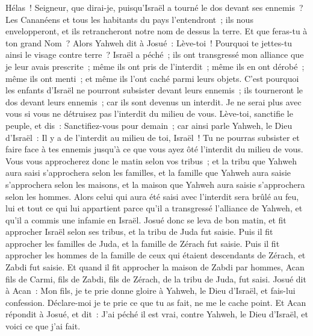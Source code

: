 \begin{multicols}{2}
Hélas~! Seigneur, que dirai-je, puisqu'Israël a tourné le dos devant ses ennemis~?
Les Cananéens et tous les habitants du pays l'entendront~; ils nous envelopperont, et ils retrancheront notre nom de dessus la terre. Et que feras-tu à ton grand Nom~?
Alors Yahweh dit à Josué~: Lève-toi~! Pourquoi te jettes-tu ainsi le visage contre terre~?
Israël a péché~; ils ont transgressé mon alliance que je leur avais prescrite~; même ils ont pris de l'interdit~; même ils en ont dérobé~; même ils ont menti~; et même ils l'ont caché parmi leurs objets.
C'est pourquoi les enfants d'Israël ne pourront subsister devant leurs ennemis~; ils tourneront le dos devant leurs ennemis~; car ils sont devenus un interdit. Je ne serai plus avec vous si vous ne détruisez pas l'interdit du milieu de vous.
Lève-toi, sanctifie le peuple, et dis~: Sanctifiez-vous pour demain~; car ainsi parle Yahweh, le Dieu d'Israël~: Il y a de l'interdit au milieu de toi, Israël~! Tu ne pourras subsister et faire face à tes ennemis jusqu'à ce que vous ayez ôté l'interdit du milieu de vous.
Vous vous approcherez donc le matin selon vos tribus~; et la tribu que Yahweh aura saisi s'approchera selon les familles, et la famille que Yahweh aura saisie s'approchera selon les maisons, et la maison que Yahweh aura saisie s'approchera selon les hommes.
Alors celui qui aura été saisi avec l'interdit sera brûlé au feu, lui et tout ce qui lui appartient parce qu'il a transgressé l'alliance de Yahweh, et qu'il a commis une infamie en Israël.
Josué donc se leva de bon matin, et fit approcher Israël selon ses tribus, et la tribu de Juda fut saisie.
Puis il fit approcher les familles de Juda, et la famille de Zérach fut saisie. Puis il fit approcher les hommes de la famille de ceux qui étaient descendants de Zérach, et Zabdi fut saisie.
Et quand il fit approcher la maison de Zabdi par hommes, Acan fils de Carmi, fils de Zabdi, fils de Zérach, de la tribu de Juda, fut saisi.
Josué dit à Acan~: Mon fils, je te prie donne gloire à Yahweh, le Dieu d'Israël, et fais-lui confession. Déclare-moi je te prie ce que tu as fait, ne me le cache point.
Et Acan répondit à Josué, et dit~: J'ai péché il est vrai, contre Yahweh, le Dieu d'Israël, et voici ce que j'ai fait.

\end{multicols}
